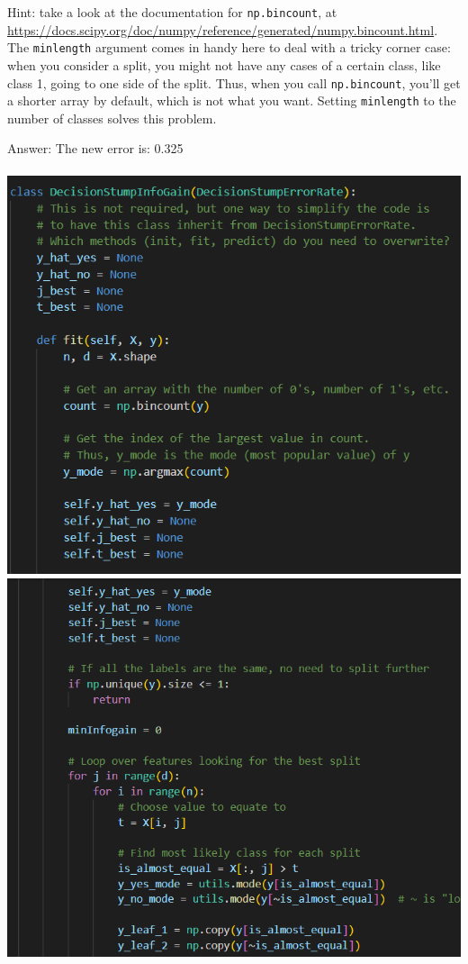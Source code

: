 \documentclass{article}
\def\ans#1{\par\gre{Answer: #1}}
\def\gre#1{{\color{gre}#1}}
\begin{document}
  Hint: take a look at the documentation for \texttt{np.bincount}, at \\
  \url{https://docs.scipy.org/doc/numpy/reference/generated/numpy.bincount.html}.
  The \texttt{minlength} argument comes in handy here to deal with a tricky corner case:
  when you consider a split, you might not have any cases of a certain class, like class 1,
  going to one side of the split. Thus, when you call \texttt{np.bincount}, you'll get
  a shorter array by default, which is not what you want. Setting \texttt{minlength} to the
  number of classes solves this problem.
  \ans{The new error is: 0.325}\\\\
  \includegraphics{6_3_1}
  \includegraphics{6_3_2}
\end{document}
